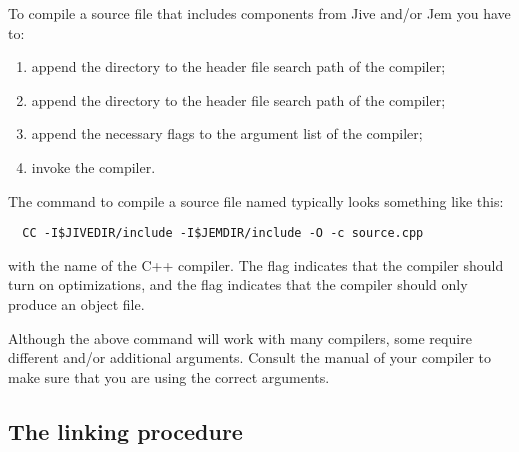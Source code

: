 To compile a source file that includes components from Jive and/or Jem
you have to:
\begin{enumerate}

\item append the directory  to the header file
  search path of the compiler;

\item append the directory  to the header file
  search path of the compiler;

\item append the necessary flags to the argument list of the compiler;

\item invoke the compiler.

\end{enumerate}
The command to compile a source file named  typically
looks something like this:
\begin{verbatim}
  CC -I$JIVEDIR/include -I$JEMDIR/include -O -c source.cpp
\end{verbatim}
with  the name of the C++ compiler. The flag  indicates
that the compiler should turn on optimizations, and the flag 
indicates that the compiler should only produce an object file.

Although the above command will work with many compilers, some require
different and/or additional arguments. Consult the manual of your
compiler to make sure that you are using the correct arguments.


\subsection*{The linking procedure}


